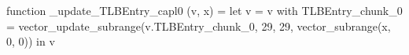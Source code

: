 function _update_TLBEntry_capl0 (v, x) = let v = { v with TLBEntry_chunk_0 = vector_update_subrange(v.TLBEntry_chunk_0, 29, 29, vector_subrange(x, 0, 0)) } in v
